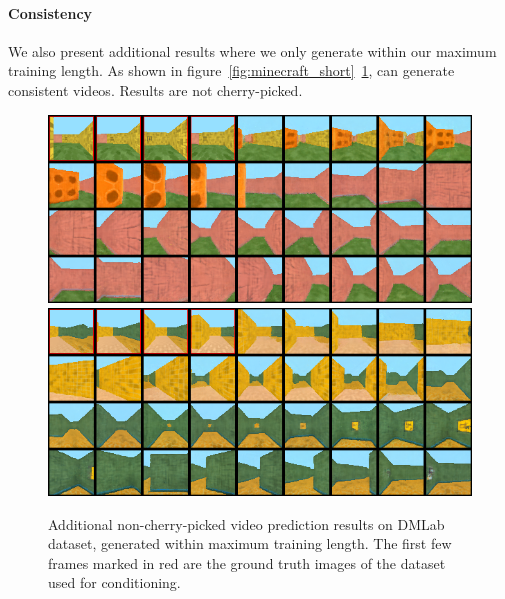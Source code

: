 \paragraph{Consistency}
We also present additional results where we only generate within our maximum training length. As shown in figure~\ref{fig:minecraft_short}~\ref{fig:dmlab_short}, \algo{} can generate consistent videos. Results are not cherry-picked.
\begin{figure}[h]
    \centering
    \includegraphics[width=\textwidth]{figures/appendix_vis/dmlab_df_0.png}
    \includegraphics[width=\textwidth]{figures/appendix_vis/dmlab_df_1.png}
    \caption{Additional non-cherry-picked video prediction results on DMLab dataset, generated within maximum training length. The first few frames marked in red are the ground truth images of the dataset used for conditioning.}
    \label{fig:dmlab_short}
\end{figure}

